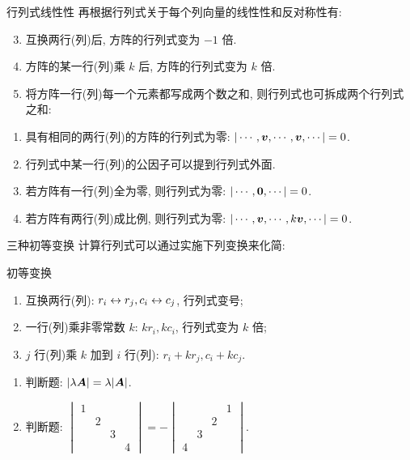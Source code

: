 \begin{frame}{行列式线性性}
	\onslide<+->
	再根据行列式关于每个列向量的线性性和反对称性有:
	\onslide<+->
	\begin{second@}
		\begin{enumerate}
			\setcounter{enumi}{2}
			\item 互换两行(列)后, 方阵的行列式变为 $-1$ 倍.
			\item 方阵的某一行(列)乘 $k$ 后, 方阵的行列式变为 $k$ 倍.
			\item 将方阵一行(列)每一个元素都写成两个数之和, 则行列式也可拆成两个行列式之和:
		\end{enumerate}
	\end{second@}
	\onslide<+->
	\begin{corollary}
		\begin{enumerate}
			\item 具有相同的两行(列)的方阵的行列式为零: $|\cdots,{\boldsymbol{v}},\cdots,{\boldsymbol{v}},\cdots|=0$.
			\item 行列式中某一行(列)的公因子可以提到行列式外面.
			\item 若方阵有一行(列)全为零, 则行列式为零: $|\cdots,{\bf0},\cdots|=0$.
			\item 若方阵有两行(列)成比例, 则行列式为零: $|\cdots,{\boldsymbol{v}},\cdots,k{\boldsymbol{v}},\cdots|=0$.
		\end{enumerate}
	\end{corollary}
\end{frame}


\begin{frame}{三种初等变换}
	\onslide<+->
	计算行列式可以通过实施下列变换来化简:
	\onslide<+->
	\begin{third}{初等变换}
		\begin{enumerate}
			\item 互换两行(列): \alert{$r_i\leftrightarrow r_j, c_i\leftrightarrow c_j$}, 行列式变号;
			\item 一行(列)乘\alert{非零常数} $k$: \alert{$kr_i, kc_i$}, 行列式变为 $k$ 倍;
			\item $j$ 行(列)乘 $k$ 加到 $i$ 行(列): \alert{$r_i+kr_j, c_i+kc_j$}.
		\end{enumerate}
	\end{third}
	\onslide<+->
	\begin{exercise}
		\begin{enumerate}
			\item 判断题: $|\lambda {\boldsymbol{A}}|=\lambda|{\boldsymbol{A}}|$. \visible<+->{\alert{$|\lambda \bfA|=\lambda^n|\bfA|$}}
			\item 判断题: $\begin{vmatrix}
				1&&&\\&2&&\\&&3&\\&&&4
			\end{vmatrix}=-\begin{vmatrix}
				&&&1\\&&2&\\&3&&\\4&&&
			\end{vmatrix}$. \visible<+->{\Huge\alert{$\times$}}
		\end{enumerate}
	\end{exercise}
\end{frame}


